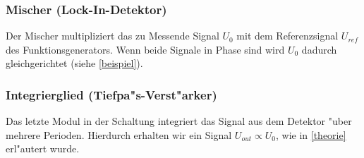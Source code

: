 \documentclass{scrartcl}
\begin{document}
\subsubsection{Mischer (Lock-In-Detektor)}

Der Mischer multipliziert das zu Messende Signal $U_0$ mit dem Referenzsignal $U_{ref}$ des Funktionsgenerators. Wenn beide Signale in Phase sind wird $U_0$ dadurch gleichgerichtet (siehe \ref{beispiel}).

\subsubsection{Integrierglied (Tiefpa"s-Verst"arker)}

Das letzte Modul in der Schaltung integriert das Signal aus dem Detektor "uber mehrere Perioden.
Hierdurch erhalten wir ein Signal $U_{out} \propto U_0$, wie in \ref{theorie} erl"autert wurde.
\end{document}
